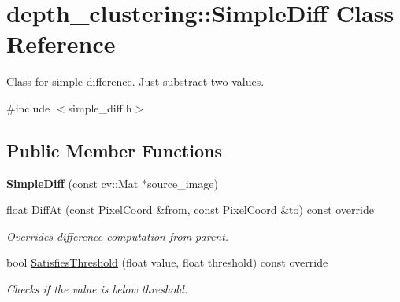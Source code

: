 \hypertarget{classdepth__clustering_1_1SimpleDiff}{\section{depth\-\_\-clustering\-:\-:Simple\-Diff Class Reference}
\label{classdepth__clustering_1_1SimpleDiff}
}


Class for simple difference. Just substract two values.  




{\ttfamily \#include $<$simple\-\_\-diff.\-h$>$}

\subsection*{Public Member Functions}
\begin{DoxyCompactItemize}
\item 
\hypertarget{classdepth__clustering_1_1SimpleDiff_aab5f0ec87c9be2afd089420070126a99}{{\bfseries Simple\-Diff} (const cv\-::\-Mat $\ast$source\-\_\-image)}\label{classdepth__clustering_1_1SimpleDiff_aab5f0ec87c9be2afd089420070126a99}

\item 
\hypertarget{classdepth__clustering_1_1SimpleDiff_a3afe28bd6a9cfbaff18e856a04d24824}{float \hyperlink{classdepth__clustering_1_1SimpleDiff_a3afe28bd6a9cfbaff18e856a04d24824}{Diff\-At} (const \hyperlink{structdepth__clustering_1_1PixelCoord}{Pixel\-Coord} \&from, const \hyperlink{structdepth__clustering_1_1PixelCoord}{Pixel\-Coord} \&to) const override}\label{classdepth__clustering_1_1SimpleDiff_a3afe28bd6a9cfbaff18e856a04d24824}

\begin{DoxyCompactList}\small\item\em Overrides difference computation from parent. \end{DoxyCompactList}\item 
\hypertarget{classdepth__clustering_1_1SimpleDiff_a277c862d4ffdf1bfc24bd1bd70cb98a7}{bool \hyperlink{classdepth__clustering_1_1SimpleDiff_a277c862d4ffdf1bfc24bd1bd70cb98a7}{Satisfies\-Threshold} (float value, float threshold) const override}\label{classdepth__clustering_1_1SimpleDiff_a277c862d4ffdf1bfc24bd1bd70cb98a7}

\begin{DoxyCompactList}\small\item\em Checks if the value is below threshold. \end{DoxyCompactList}\end{DoxyCompactItemize}
